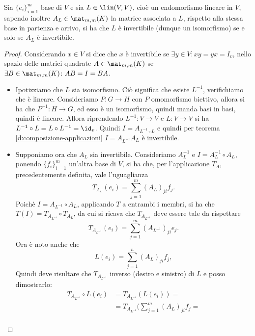 \begin{teorema}
	Sia $\{e_i\}_{i=1}^m$ base di $V$ e sia $L\in \lin(V,V)$, cioè un endomorfismo lineare in $V$, sapendo inoltre $A_L\in\mat_{m,m}(K)$ la matrice associata a $L$, rispetto alla stessa base in partenza e arrivo, si ha che $L$ è invertibile (dunque un isomorfismo) se e solo se $A_L$ è invertibile.
\end{teorema}
\begin{proof}
	Considerando $x\in V$ si dice che $x$ è invertibile se $\exists y\in V\colon xy = yx = I_v$, nello spazio delle matrici quadrate $A\in\mat_{m,m}(K)$ se $\exists B\in\mat_{m,m}(K)\colon AB = I = BA$.
	\begin{itemize}
	\item Ipotizziamo che $L$ sia isomorfismo.
		Ciò significa che esiste $L^{-1}$, verifichiamo che è lineare.
		Consideriamo $P\colon G\to H$ con $P$ omomorfismo biettivo, allora si ha che $P^{-1}\colon H\to G$, ed esso è un isomorfismo, quindi manda basi in basi, quindi è lineare.
		Allora riprendendo $L^{-1}\colon V\to V$ e  $L\colon V\to V$ si ha  $L^{-1}\circ L = L\circ L^{-1} = \id_v$.
		Quindi $I = A_{L^{-1}\circ L}$ e quindi per teorema \ref{d:composizione-applicazioni} $I = A_{L^{-1}} A_L$ è invertibile.
	\item Supponiamo ora che $A_L$ sia invertibile.
		Consideriamo $A_L^{-1}$ e $I = A_L^{-1}\circ A_L$, ponendo $\{f_i\}_{i=1}^m$ un'altra base di $V$, si ha che, per l'applicazione $T_A$, precedentemente definita, vale l'uguaglianza
		\begin{equation*}
		T_{A_L}(e_i) = \sum_{j=1}^m(A_L)_{ji}f_j.
			\end{equation*}
		Poichè $I = A_{L^{-1}}\circ A_L$, applicando $T$ a entrambi i membri, si ha che $T(I) = T_{A_{L^{-1}}}\circ T_{A_L}$, da cui si ricava che $T_{A_{L^{-1}}}$ deve essere tale da rispettare
		\begin{equation*}
			T_{A_{L^{-1}}}(e_i) = \sum_{j=1}^m(A_{L^{-1}})_{ji}e_j.
		\end{equation*}
		Ora è noto anche che
		\begin{equation*}
			L(e_i) = \sum_{j=1}^n(A_L)_{ji}f_j,
		\end{equation*}
		Quindi deve risultare che $T_{A_{L^{-1}}}$ inverso (destro e sinistro) di $L$ e posso dimostrarlo:
		\begin{equation*}
			\begin{split}
				T_{A_{L^{-1}}}\circ L (e_i) &= T_{A_{L^{-1}}} (L(e_i)) =\\
				&= T_{A_{L^{-1}}}(\sum_{j=1}^m(A_{L})_{ji} f_{j} =\\ 

\end{split}
\end{equation*}
\end{itemize}
\end{proof}
